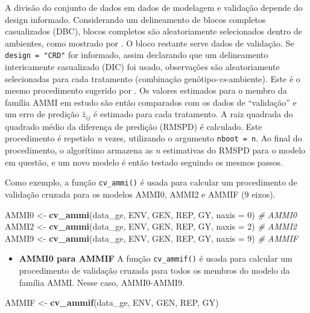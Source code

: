 \documentclass[
]{book}
\newenvironment{Shaded}{\begin{snugshade}}{\end{snugshade}}
\newcommand{\CommentTok}[1]{\textcolor[rgb]{0.56,0.35,0.01}{\textit{#1}}}
\newcommand{\DataTypeTok}[1]{\textcolor[rgb]{0.13,0.29,0.53}{#1}}
\newcommand{\DecValTok}[1]{\textcolor[rgb]{0.00,0.00,0.81}{#1}}
\newcommand{\KeywordTok}[1]{\textcolor[rgb]{0.13,0.29,0.53}{\textbf{#1}}}
\newcommand{\NormalTok}[1]{#1}
\newcommand{\StringTok}[1]{\textcolor[rgb]{0.31,0.60,0.02}{#1}}
\providecommand{\tightlist}{%
  \setlength{\itemsep}{0pt}\setlength{\parskip}{0pt}}
\begin{document}
A divisão do conjunto de dados em dados de modelagem e validação depende do design informado. Considerando um delineamento de blocos completos casualizados (DBC), blocos completos são aleatoriamente selecionados dentro de ambientes, como mostrado por \citet{Olivoto2019}. O bloco restante serve dados de validação. Se \texttt{design\ =\ "CRD"} for informado, assim declarando que um delineamento intericamente casualizado (DIC)  foi usado, observações são aleatoriamente selecionadas para cada tratamento (combinação genótipo-\emph{vs}-ambiente). Este é o mesmo procedimento sugerido por \citet{Gauch1988}. Os valores estimados para o membro da família AMMI em estudo são então comparados com os dados de ``validação'' e um erro de predição \(\hat{z}_{ij}\) é estimado para cada tratamento. A raiz quadrada do quadrado médio da diferença de predição (RMSPD) é calculado. Este procedimento é repetido \emph{n} vezes, utilizando o argumento \texttt{nboot\ =\ n}. Ao final do procedimento, o algorítimo armazena as \emph{n} estimativas do RMSPD para o modelo em questão, e um novo modelo é então testado seguindo os mesmos passos.

Como exemplo, a função \texttt{cv\_ammi()} é usada para calcular um procedimento de validação cruzada para os modelos AMMI0, AMMI2 e AMMIF (9 eixos).

\begin{Shaded}
\begin{Highlighting}[]
\NormalTok{AMMI0 <-}\StringTok{ }\KeywordTok{cv_ammi}\NormalTok{(data_ge, ENV, GEN, REP, GY, }\DataTypeTok{naxis =} \DecValTok{0}\NormalTok{) }\CommentTok{# AMMI0}
\NormalTok{AMMI2 <-}\StringTok{ }\KeywordTok{cv_ammi}\NormalTok{(data_ge, ENV, GEN, REP, GY, }\DataTypeTok{naxis =} \DecValTok{2}\NormalTok{) }\CommentTok{# AMMI2}
\NormalTok{AMMI9 <-}\StringTok{ }\KeywordTok{cv_ammi}\NormalTok{(data_ge, ENV, GEN, REP, GY, }\DataTypeTok{naxis =} \DecValTok{9}\NormalTok{) }\CommentTok{# AMMIF}
\end{Highlighting}
\end{Shaded}

\begin{itemize}
\tightlist
\item
  \textbf{AMMI0 para AMMIF}
  A função \texttt{cv\_ammif()} é usada para calcular um procedimento de validação cruzada para todos os membros do modelo da família AMMI. Nesse caso, AMMI0-AMMI9.
\end{itemize}

\begin{Shaded}
\begin{Highlighting}[]
\NormalTok{AMMIF <-}\StringTok{ }\KeywordTok{cv_ammif}\NormalTok{(data_ge, ENV, GEN, REP, GY)}
\end{Highlighting}
\end{Shaded}
\end{document}
